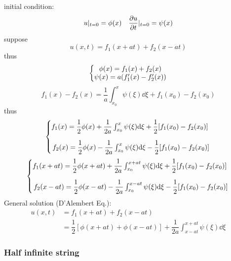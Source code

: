 \documentclass[UTF8]{ctexart} %
\DeclareMathOperator{\p}{\prime}
\numberwithin{equation}{section}
\begin{document}
initial condition:
\begin{equation}\label{key}
u|_{t=0} = \phi(x)\quad \pdv{u}{t}|_{t=0} = \psi(x)
\end{equation}
suppose 
\begin{equation}\label{key}
u(x,t) = f_1(x+at) + f_2(x-at)
\end{equation}
thus
\begin{equation}\label{key}
\left\{\mqty{\phi(x) = f_1(x) + f_2(x)\\
	\psi(x) = a(f_1^{\p}(x) - f_2^{\p}(x))}
\right.
\end{equation}
\begin{equation}\label{key}
f_1(x) - f_2(x) = \dfrac{1}{a}\int_{x_0}^x \psi(\xi)\dd\xi + f_1(x_0) - f_2(x_0)
\end{equation}
thus
\begin{equation}\label{key}
\left\{\mqty{f_1(x) = \dfrac{1}{2}\phi(x) + \dfrac{1}{2a}\int_{x_0}^x \psi(\xi)\dd\xi + \dfrac{1}{2}[f_1(x_0) - f_2(x_0)]~\vspace{10pt}\\
f_2(x) = \dfrac{1}{2}\phi(x) - \dfrac{1}{2a}\int_{x_0}^x \psi(\xi)\dd\xi - \dfrac{1}{2}[f_1(x_0) - f_2(x_0)]}\right.
\end{equation}
\begin{equation}\label{key}
\left\{\mqty{f_1(x+at) = \dfrac{1}{2}\phi(x+at) + \dfrac{1}{2a}\int_{x_0}^{x+at} \psi(\xi)\dd\xi + \dfrac{1}{2}[f_1(x_0) - f_2(x_0)]~\vspace{10pt}\\
f_2(x-at) = \dfrac{1}{2}\phi(x-at) - \dfrac{1}{2a}\int_{x_0}^{x-at} \psi(\xi)\dd\xi - \dfrac{1}{2}[f_1(x_0) - f_2(x_0)]}\right.
\end{equation}
General solution (D'Alembert Eq.):
\begin{equation}\label{key}
\begin{aligned}
u(x,t) &= f_1(x+at) + f_2(x-at)\\
&=\dfrac{1}{2}[\phi(x+at) + \phi(x-at)] + \dfrac{1}{2a}\int_{x-at}^{x+at} \psi(\xi)\dd\xi
\end{aligned}
\end{equation}

\subsubsection{Half infinite string}
\end{document}

